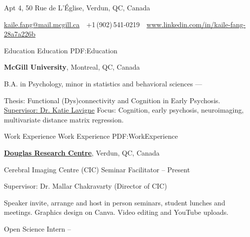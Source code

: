 \documentclass[a4paper,12pt]{article}
\newcommand{\CVAuthor}{Cathy Kaile Fang}
\begin{document}

\Title{\CVAuthor}

\begin{SubTitle}
{Apt 4, 50 Rue de L'Église, Verdun, QC, Canada}
\par
\href{kaile.fang@mail.mcgill.ca}
{kaile.fang@mail.mcgill.ca}
\,\SubBulletSymbol\,
+1\,(902)\,541-0219
\,\SubBulletSymbol\,
\href{www.linkedin.com/in/kaile-fang-28a7a226b}
{www.linkedin.com/in/kaile-fang-28a7a226b}
\end{SubTitle}

\begin{Body}


\Section
{Education}
{Education}
{PDF:Education}

\Entry
{\textbf{McGill University}},
Montreal, QC, Canada

\Gap

B.A. in Psychology, minor in statistics and behavioral sciences
\hfill
{} ---

\SubBulletItem
Thesis:
Functional (Dys)connectivity and Cognition in Early Psychosis.
\SubBulletItem
\href{https://www.mcgill.ca/psychiatry/katie-lavigne}
{Supervisor:
Dr. Katie Lavigne}
\SubBulletItem
Focus:
Cognition, early psychosis, neuroimaging, multivariate distance matrix regression.



\Section
{Work Experience}
{Work Experience}
{PDF:WorkExperience}

\Entry
\href{https://douglas.research.mcgill.ca/open-science-douglas/}
{\textbf{Douglas Research Centre}}, Verdun, QC, Canada


\BulletItem
Cerebral Imaging Centre (CIC) Seminar Facilitator
\hfill
{} -- Present

Supervisor: Dr. Mallar Chakravarty (Director of CIC)
\begin{Detail}
\SubBulletItem
Speaker invite, arrange and host in person seminars, student lunches and meetings.
\SubBulletItem
Graphics design on Canva. 
\SubBulletItem
Video editing and YouTube uploads. 
\end{Detail}

\Gap
\BulletItem
Open Science Intern
\hfill
{} -- 




\end{Body}
\end{document}
